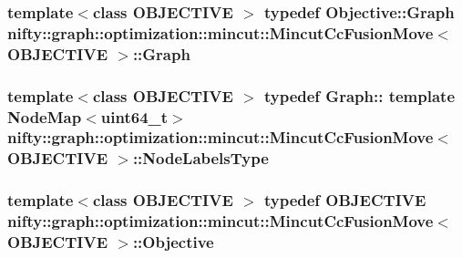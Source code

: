 \subsubsection[{Graph}]{\setlength{\rightskip}{0pt plus 5cm}template$<$class O\+B\+J\+E\+C\+T\+I\+V\+E $>$ typedef Objective\+::\+Graph {\bf nifty\+::graph\+::optimization\+::mincut\+::\+Mincut\+Cc\+Fusion\+Move}$<$ O\+B\+J\+E\+C\+T\+I\+V\+E $>$\+::{\bf Graph}}\label{classnifty_1_1graph_1_1optimization_1_1mincut_1_1MincutCcFusionMove_a046fcef6e07277b118e6e0b42417b47e}
\hypertarget{classnifty_1_1graph_1_1optimization_1_1mincut_1_1MincutCcFusionMove_afa2e5afc13c945eac0fe59c2691f43c7}{}
\subsubsection[{Node\+Labels\+Type}]{\setlength{\rightskip}{0pt plus 5cm}template$<$class O\+B\+J\+E\+C\+T\+I\+V\+E $>$ typedef Graph\+:: template Node\+Map$<$uint64\+\_\+t$>$ {\bf nifty\+::graph\+::optimization\+::mincut\+::\+Mincut\+Cc\+Fusion\+Move}$<$ O\+B\+J\+E\+C\+T\+I\+V\+E $>$\+::{\bf Node\+Labels\+Type}}\label{classnifty_1_1graph_1_1optimization_1_1mincut_1_1MincutCcFusionMove_afa2e5afc13c945eac0fe59c2691f43c7}
\hypertarget{classnifty_1_1graph_1_1optimization_1_1mincut_1_1MincutCcFusionMove_aceb1de59706d17aba8d8fa6c23d9d01b}{}
\subsubsection[{Objective}]{\setlength{\rightskip}{0pt plus 5cm}template$<$class O\+B\+J\+E\+C\+T\+I\+V\+E $>$ typedef O\+B\+J\+E\+C\+T\+I\+V\+E {\bf nifty\+::graph\+::optimization\+::mincut\+::\+Mincut\+Cc\+Fusion\+Move}$<$ O\+B\+J\+E\+C\+T\+I\+V\+E $>$\+::{\bf Objective}}\label{classnifty_1_1graph_1_1optimization_1_1mincut_1_1MincutCcFusionMove_aceb1de59706d17aba8d8fa6c23d9d01b}


